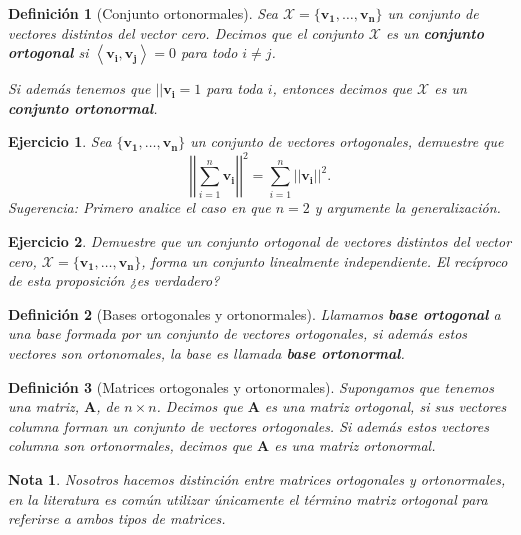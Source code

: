 \documentclass[11pt]{report}
\theoremstyle{break}
\newtheorem{definicion}{Definición}[chapter]
\newtheorem{nota}{Nota}[chapter]
\newtheorem{ejercicio}{Ejercicio}[chapter]
\theoremstyle{break}
\newcommand{\mbb}[1]{$\mathbb{#1}$}
\newcommand{\matdim}[2]{$#1 \times #2$}
\begin{document}
\begin{definicion}[Conjunto ortonormales]
Sea $\mathcal{X} = \{\bm{v_1}, \ldots, \bm{v_n} \}$ un conjunto de vectores distintos del vector cero. Decimos que el conjunto $\mathcal{X}$ es un \textbf{conjunto ortogonal} si $\left< \bm{v_i}, \bm{v_j} \right> = 0$ para todo $i \neq j$.

Si además tenemos que $||\bm{v_i} = 1$ para toda $i$, entonces decimos que $\mathcal{X}$ es un \textbf{conjunto ortonormal}.
\end{definicion}

\begin{ejercicio}
Sea $\{\bm{v_1}, \ldots, \bm{v_n} \}$ un conjunto de vectores ortogonales, demuestre que
$$ \left| \left| \sum_{i = 1}^{n} \bm{v_i} \right| \right|^{2} = \sum_{i = 1}^{n}||\bm{v_i}||^{2}.$$
Sugerencia: Primero analice el caso en que $n = 2$ y argumente la generalización.
\end{ejercicio}

\begin{ejercicio}
Demuestre que un conjunto ortogonal de vectores distintos del vector cero, $\mathcal{X} = \{\bm{v_1}, \ldots, \bm{v_n} \}$, forma un conjunto linealmente independiente. El recíproco de esta proposición ¿es verdadero? \newline
\end{ejercicio}

\begin{definicion}[Bases ortogonales y ortonormales]
Llamamos \textbf{base ortogonal} a una base formada por un conjunto de vectores ortogonales, si además estos vectores son ortonomales, la base es llamada \textbf{base ortonormal}.
\end{definicion}

\begin{definicion}[Matrices ortogonales y ortonormales]
\label{definicion:matriz-ortogonal}
Supongamos que tenemos una matriz, $\bm{A}$, de \matdim{n}{n}. Decimos que $\bm{A}$ es una matriz ortogonal, si sus vectores columna forman un conjunto de vectores ortogonales.
Si además estos vectores columna son ortonormales, decimos que $\bm{A}$ es una matriz ortonormal.
\end{definicion}

\begin{nota}
\label{nota:Matrices-ortonormales}
Nosotros hacemos distinción entre matrices ortogonales y ortonormales, en la literatura es común utilizar únicamente el término matriz ortogonal para referirse a ambos tipos de matrices.
\end{nota}
\end{document}
